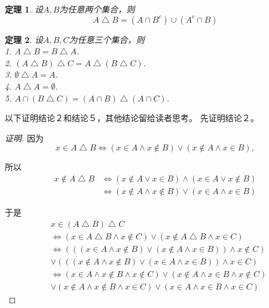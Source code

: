 \documentclass{book}[oneside]
\newtheorem{Thm}{定理}[chapter]
\begin{document}
\begin{CJK*}{UTF8}{gbsn}
      \begin{Thm}
        设$A,B$为任意两个集合，则
        \begin{equation*}
          A \bigtriangleup B = (A \cap B^c)\cup (A^c \cap B)
        \end{equation*}
      \end{Thm}
  \begin{Thm}
设$A,B,C$为任意三个集合，则\\
1. $A \bigtriangleup B = B \bigtriangleup A$.\\
2. $(A \bigtriangleup B) \bigtriangleup C = A \bigtriangleup (B \bigtriangleup C)$.\\
3. $\emptyset \bigtriangleup A = A$.\\
4. $A \bigtriangleup A = \emptyset$.\\
5. $A \cap (B \bigtriangleup C) = (A \cap B) \bigtriangleup (A \cap C)$.\\ 
  \end{Thm}

 以下证明结论２和结论５，其他结论留给读者思考。 先证明结论２。

\begin{proof}[证明]

  
  因为
  \begin{equation}
  x \in A \bigtriangleup B \Leftrightarrow
  (x \in A \land x \notin B) \lor (x \notin A \land x
  \in B),    
  \end{equation}

  所以
  \begin{equation}
    \begin{split}
      x \notin A \bigtriangleup B &\Leftrightarrow
  (x \notin A \lor x \in B) \land (x \in A \lor x
  \notin B)\\
  &\Leftrightarrow (x \notin A \land x \notin B) \lor (x \in A \land x \in B )
    \end{split}
  \end{equation}

  于是
  \begin{equation}\label{xor1}
    \begin{split}
      &x \in (A \bigtriangleup B) \bigtriangleup C\\
      &\Leftrightarrow (x \in A \bigtriangleup B \land x \notin C) \lor (x \notin A \bigtriangleup B \land x \in C)\\
      &\Leftrightarrow (((x \in A \land x \notin B) \lor (x \notin A \land x \in B)) \land x \notin C)\\
      &\lor (((x \notin A \land x \notin B) \lor (x \in A \land x \in B )) \land x \in C)\\
      &\Leftrightarrow (x \in A \land x \notin B \land x \notin C) \lor (x \notin A \land x \in B \land x \notin C)\\
      &\lor (x \notin A \land x \notin B \land x \in C) \lor (x \in A \land x \in B \land x \in C)
    \end{split}
  \end{equation}


\end{proof}
\end{CJK*}
\end{document}
